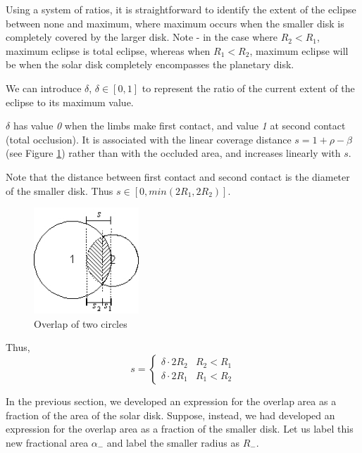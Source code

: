      Using a system of ratios, it is straightforward to identify the extent
     of the eclipse between none and maximum, where maximum occurs when the
     smaller disk is completely covered by the larger disk.
     Note - in the case where
     $R_{2}<R_{1}$, maximum eclipse is total eclipse, whereas when
     $R_{1}<R_{2}$, maximum eclipse will be when the solar disk
     completely encompasses the planetary disk.

   We can introduce $\delta$, $\delta \in [0,1]$  to represent
   the ratio of the
   current extent of the eclipse to its maximum value.

   ${\delta}$ has value \textit{0} when the limbs make first
   contact, and value \textit{1} at second contact (total occlusion).
   It is associated with the linear coverage distance
   $s =  1 + \rho - \beta$ (see  Figure
   \ref{fig:shadow_calc5}) rather than with the occluded area,
   and increases linearly with $s$.\

   Note that the distance between first contact
   and second contact is the diameter of the smaller disk.  Thus
   $s \in [0, min (2R_1,2R_{2})]$.

   \begin{figure}[!ht]
   \begin{center}
    \includegraphics[height=40mm]{figs/shadow/shadow_calculator_fig5.jpg}
    \end{center}
    \caption{Overlap of two circles}
    \label{fig:shadow_calc5}
   \end{figure}

   Thus,
   \begin{equation*}
   s=
   \begin{cases}
     \delta \cdot 2R_{2}     & R_{2}<R_{1} \\
     \delta \cdot 2R_{1}     & R_{1}<R_{2}
   \end{cases}
   \end{equation*}

   In the previous section, we developed an expression for the overlap area
   as a fraction of the area of the solar disk.  Suppose, instead, we had
   developed an expression for the overlap area as a fraction of the smaller
   disk.  Let us label this new fractional area $\alpha_{-}$ and label the
   smaller radius as $R_{-}$.

